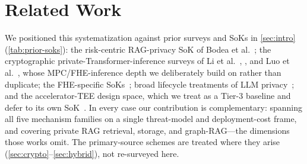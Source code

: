 \section{Related Work}
\label{sec:related}

We positioned this systematization against prior surveys and SoKs in \cref{sec:intro}
(\cref{tab:prior-soks}): the risk-centric RAG-privacy SoK of Bodea et
al.~\citep{bodea_sok}; the cryptographic private-Transformer-inference surveys of Li et
al.~\citep{li_pti_survey}, \citet{pti_survey_2024}, and Luo et
al.~\citep{luo_cplm_survey}, whose MPC/FHE-inference depth we deliberately build on rather
than duplicate; the FHE-specific SoKs~\citep{xue_fhe_sok,albadawi_ckks_sok}; broad
lifecycle treatments of LLM privacy~\citep{ma_semantic_sok}; and the accelerator-TEE
design space, which we treat as a Tier-3 baseline and defer to its own
SoK~\citep{accel_tee_sok}. In every case our contribution is complementary: spanning all
five mechanism families on a single threat-model and deployment-cost frame, and covering
private RAG retrieval, storage, and graph-RAG---the dimensions those works omit. The
primary-source schemes are treated where they arise (\cref{sec:crypto}--\cref{sec:hybrid}),
not re-surveyed here.
